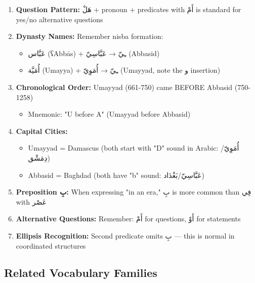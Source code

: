 \documentclass[letterpaper,12pt]{article}
\begin{document}
\begin{enumerate}
\item \textbf{Question Pattern:} \textarabic{هَلْ + pronoun + predicates with أَمْ} is standard for yes/no alternative questions

\item \textbf{Dynasty Names:} Remember nisba formation:
\begin{itemize}
\item \textarabic{عَبَّاس} (ʕAbbās) + \textarabic{ـِيّ} → \textarabic{عَبَّاسِيّ} (Abbasid)
\item \textarabic{أُمَيَّة} (Umayya) + \textarabic{ـِيّ} → \textarabic{أُمَوِيّ} (Umayyad, note the \textarabic{و} insertion)
\end{itemize}

\item \textbf{Chronological Order:} Umayyad (661-750) came BEFORE Abbasid (750-1258)
\begin{itemize}
\item Mnemonic: "U before A" (Umayyad before Abbasid)
\end{itemize}

\item \textbf{Capital Cities:} 
\begin{itemize}
\item Umayyad = Damascus (both start with "D" sound in Arabic: \textarabic{أُمَوِيّ/دِمَشْق})
\item Abbasid = Baghdad (both have "b" sound: \textarabic{عَبَّاسِيّ/بَغْدَاد})
\end{itemize}

\item \textbf{Preposition \textarabic{بِ}:} When expressing "in an era," \textarabic{بِ} is more common than \textarabic{فِي} with \textarabic{عَصْر}

\item \textbf{Alternative Questions:} Remember: \textarabic{أَمْ} for questions, \textarabic{أَوْ} for statements

\item \textbf{Ellipsis Recognition:} Second predicate omits \textarabic{بِ} — this is normal in coordinated structures
\end{enumerate}

\subsection{Related Vocabulary Families}
\end{document}
